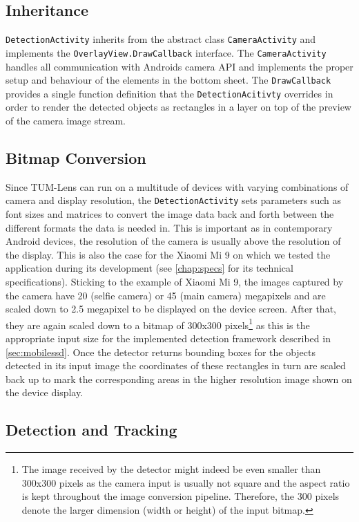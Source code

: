 \documentclass[
			   fontsize=11pt,
               paper=a4,
               bibliography=totoc,
               idxtotoc,
               headsepline,
               footsepline,
               footinclude=false,
               BCOR=12mm,
               DIV=13,
               openany,   %
               ]
               {scrbook}
\newcommand{\code}[1]{\lstinline[basicstyle = \ttfamily\small]{#1}} %
\begin{document}
\subsection{Inheritance}

\code{DetectionActivity} inherits from the abstract class \code{CameraActivity} and implements the \code{OverlayView.DrawCallback} interface. The \code{CameraActivity} handles all communication with Androids camera API and implements the proper setup and behaviour of the elements in the bottom sheet. The \code{DrawCallback} provides a single function definition that the \code{DetectionAcitivty} overrides in order to render the detected objects as rectangles in a layer on top of the preview of the camera image stream.

\subsection{Bitmap Conversion}

Since TUM-Lens can run on a multitude of devices with varying combinations of camera and display resolution, the \code{DetectionActivity} sets parameters such as font sizes and matrices to convert the image data back and forth between the different formats the data is needed in. This is important as in contemporary Android devices, the resolution of the camera is usually above the resolution of the display. This is also the case for the Xiaomi Mi 9 on which we tested the application during its development (see \autoref{chap:specs} for its technical specifications). Sticking to the example of Xiaomi Mi 9, the images captured by the camera have 20 (selfie camera) or 45 (main camera) megapixels and are scaled down to 2.5 megapixel to be displayed on the device screen. After that, they are again scaled down to a bitmap of 300x300 pixels\footnote{The image received by the detector might indeed be even smaller than 300x300 pixels as the camera input is usually not square and the aspect ratio is kept throughout the image conversion pipeline. Therefore, the 300 pixels denote the larger dimension (width or height) of the input bitmap.} as this is the appropriate input size for the implemented detection framework described in \autoref{sec:mobilessd}. Once the detector returns bounding boxes for the objects detected in its input image the coordinates of these rectangles in turn are scaled back up to mark the corresponding areas in the higher resolution image shown on the device display.

\subsection{Detection and Tracking}
\end{document}
